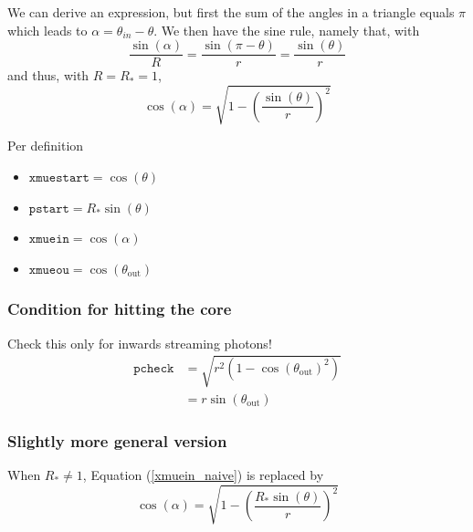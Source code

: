 \documentclass[../main/main.tex]{subfiles}
\begin{document}
We can derive an expression, but first the sum of the angles in a triangle equals $\pi$ which leads to $\alpha = \theta_{in} - \theta$. We then have the sine rule, namely that, with
\begin{equation}
\frac{\sin(\alpha)}{R} = \frac{\sin(\pi-\theta)}{r} = \frac{\sin(\theta)}{r}
\end{equation}
and thus, with $R=R_{*} = 1$,
\begin{equation}
\cos(\alpha) = \sqrt{1 - \left( \frac{\sin(\theta)}{r} \right)^2}
\label{xmuein_naive}
\end{equation}

Per definition 
\begin{itemize}
\item $\texttt{xmuestart} = \cos(\theta)$

\item $\texttt{pstart} = R_* \sin(\theta)$

\item $\texttt{xmuein} = \cos(\alpha)$ 

\item $\texttt{xmueou} = \cos(\theta_{\text{out}})$
\end{itemize}

\subsubsection{Condition for hitting the core}
Check this only for inwards streaming photons!
\begin{equation}
\begin{aligned}
\texttt{pcheck} &= \sqrt{r^2 \left(1- \cos(\theta_{\text{out}})^2 \right)} \\
&= r\sin(\theta_{\text{out}}) 
\end{aligned}
\end{equation}

\subsubsection{Slightly more general version}
When $R_* \neq 1$, Equation (\ref{xmuein_naive}) is replaced by
\begin{equation}
\cos(\alpha) = \sqrt{1 - \left( \frac{R_* \sin(\theta)}{r} \right)^2}
\end{equation}

\newpage
\end{document}

